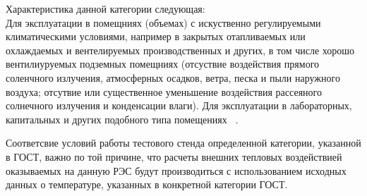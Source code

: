 Характеристика данной категории следующая:\\
Для эксплуатации в помещниях (объемах) с искуственно регулируемыми
климатическими условиями, например в закрытых отапливаемых или
охлаждаемых и вентелируемых производственных и других, в том числе
хорошо вентилиуруемых подземных помещниях (отсуствие воздействия
прямого соленчного излучения, атмосферных осадков, ветра, песка и пыли
наружного воздуха; отсутвие или существенное уменьшение воздействия
рассеяного солнечного излучения и конденсации влаги). Для эксплуатации
в лабораторных, капитальных и других подобного типа помещениях ~\cite{GOST-15150-69}.

Соответсвие условий работы тестового стенда определенной категории,
указанной в ГОСТ, важно по той причине,
что расчеты внешних тепловых воздействией оказываемых на данную РЭС будут производиться с использованием исходных данных о температуре,
указанных в конкретной категории ГОСТ.